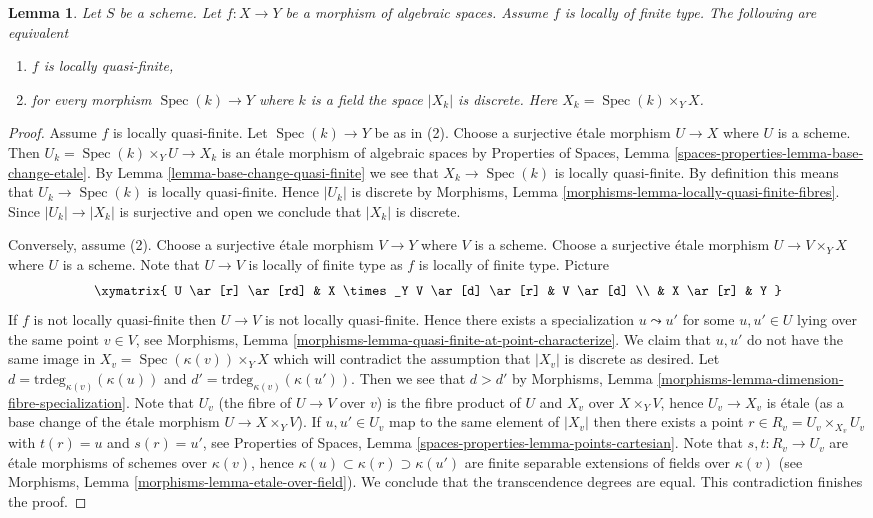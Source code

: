 \documentclass{stacks-project}
\theoremstyle{plain}
\newtheorem{lemma}[subsection]{Lemma}
\theoremstyle{definition}
\theoremstyle{remark}
\numberwithin{equation}{subsection}
\def\Spec{\mathop{\mathrm{Spec}}}
\begin{document}
\begin{lemma}
\label{lemma-locally-quasi-finite}
Let $S$ be a scheme. Let $f : X \to Y$ be a morphism of algebraic spaces.
Assume $f$ is locally of finite type. The following are equivalent
\begin{enumerate}
\item $f$ is locally quasi-finite,
\item for every morphism $\Spec(k) \to Y$ where $k$ is a field
the space $|X_k|$ is discrete. Here $X_k = \Spec(k) \times_Y X$.
\end{enumerate}
\end{lemma}

\begin{proof}
Assume $f$ is locally quasi-finite. Let $\Spec(k) \to Y$ be as
in (2). Choose a surjective \'etale morphism $U \to X$ where $U$ is a scheme.
Then $U_k = \Spec(k) \times_Y U \to X_k$ is an
\'etale morphism of algebraic spaces by
Properties of Spaces, Lemma \ref{spaces-properties-lemma-base-change-etale}.
By
Lemma \ref{lemma-base-change-quasi-finite}
we see that $X_k \to \Spec(k)$ is locally quasi-finite. By
definition this means that $U_k \to \Spec(k)$ is locally
quasi-finite. Hence $|U_k|$ is discrete by
Morphisms, Lemma \ref{morphisms-lemma-locally-quasi-finite-fibres}.
Since $|U_k| \to |X_k|$ is surjective and open we conclude that $|X_k|$
is discrete.

\medskip\noindent
Conversely, assume (2). Choose a surjective \'etale morphism $V \to Y$
where $V$ is a scheme. Choose a surjective \'etale morphism
$U \to V \times_Y X$ where $U$ is a scheme.
Note that $U \to V$ is locally of finite type as $f$ is locally of finite type.
Picture
$$
\xymatrix{
U \ar[r] \ar[rd] & X \times_Y V \ar[d] \ar[r] & V \ar[d] \\
& X \ar[r] & Y
}
$$
If $f$ is not locally quasi-finite then $U \to V$ is not locally quasi-finite.
Hence there exists a specialization $u \leadsto u'$ for some $u, u' \in U$
lying over the same point $v \in V$, see
Morphisms, Lemma \ref{morphisms-lemma-quasi-finite-at-point-characterize}.
We claim that $u, u'$ do not have the same image in
$X_v = \Spec(\kappa(v)) \times_Y X$
which will contradict the assumption that $|X_v|$ is discrete as desired.
Let $d = \text{trdeg}_{\kappa(v)}(\kappa(u))$ and
$d' = \text{trdeg}_{\kappa(v)}(\kappa(u'))$.
Then we see that $d > d'$ by
Morphisms, Lemma \ref{morphisms-lemma-dimension-fibre-specialization}.
Note that $U_v$ (the fibre of $U \to V$ over $v$) is the fibre product of
$U$ and $X_v$ over $X \times_Y V$, hence $U_v \to X_v$ is \'etale (as a
base change of the \'etale morphism $U \to X \times_Y V$). If
$u, u' \in U_v$ map to the same element of $|X_v|$ then there exists a point
$r \in R_v = U_v \times_{X_v} U_v$ with $t(r) = u$ and $s(r) = u'$, see
Properties of Spaces, Lemma \ref{spaces-properties-lemma-points-cartesian}.
Note that $s, t : R_v \to U_v$ are \'etale morphisms of schemes
over $\kappa(v)$, hence $\kappa(u) \subset \kappa(r) \supset \kappa(u')$
are finite separable extensions of fields over $\kappa(v)$ (see
Morphisms, Lemma \ref{morphisms-lemma-etale-over-field}).
We conclude that the transcendence degrees are equal.
This contradiction finishes the proof.
\end{proof}
\end{document}
